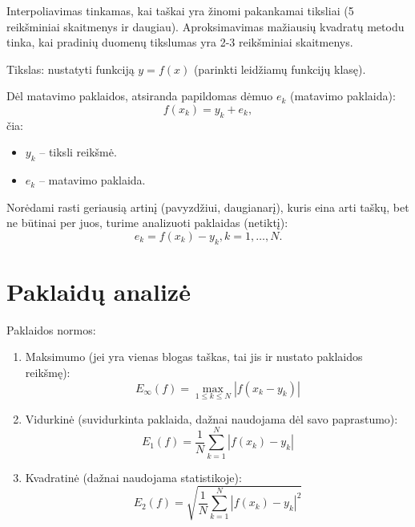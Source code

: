 



Interpoliavimas tinkamas, kai taškai yra žinomi pakankamai tiksliai (5
reikšminiai skaitmenys ir daugiau). Aproksimavimas mažiausių
kvadratų metodu tinka, kai pradinių duomenų tikslumas yra 2-3
reikšminiai skaitmenys.


Tikslas: nustatyti funkciją $y=f(x)$ (parinkti leidžiamų funkcijų klasę).

Dėl matavimo paklaidos, atsiranda papildomas dėmuo $e_{k}$ (matavimo paklaida):
\begin{equation*}
  f(x_{k}) = y_{k} + e_{k},
\end{equation*}
čia:
\begin{itemize}
  \item $y_{k}$ – tiksli reikšmė.
  \item $e_{k}$ – matavimo paklaida.
\end{itemize}

Norėdami rasti geriausią artinį (pavyzdžiui, daugianarį), kuris eina arti
taškų, bet ne būtinai per juos, turime analizuoti paklaidas (netiktį):
\begin{equation*}
  e_{k} = f(x_{k}) - y_{k}, k=1,\ldots,N.
\end{equation*}


\section{Paklaidų analizė}

Paklaidos normos:
\begin{enumerate}
  \item Maksimumo (jei yra vienas blogas taškas, tai jis ir nustato
    paklaidos reikšmę):
    \begin{equation*}
      E_{\infty}(f) = \max_{1 \leq k \leq N} |f(x_{k} - y_{k})|
    \end{equation*}
  \item Vidurkinė (suvidurkinta paklaida, dažnai naudojama dėl savo
    paprastumo):
    \begin{equation*}
      E_{1}(f) = \frac{1}{N}\sum_{k=1}^{N}|f(x_{k}) - y_{k}|
    \end{equation*}
  \item Kvadratinė (dažnai naudojama statistikoje):
    \begin{equation*}
      E_{2}(f) = \sqrt{\frac{1}{N}\sum_{k=1}^{N}|f(x_{k})-y_{k}|^{2}}
    \end{equation*}
\end{enumerate}

